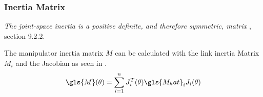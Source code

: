 %



%

%
%



\subsubsection{Inertia Matrix }

\textit{The joint-space inertia is a positive definite, and therefore symmetric, matrix} \cite{CorkeRoboticVisionControl}, section 9.2.2.

The manipulator inertia matrix $M$ can be calculated with the link inertia Matrix $M_i$ and the Jacobian as seen in .
\begin{equation}\label{eq:ManipInMatr}
	\gls{M}(\theta) = \sum_{i=1}^{n} J_i^T(\theta) \gls{M_hat}_i J_i(\theta)
\end{equation}

